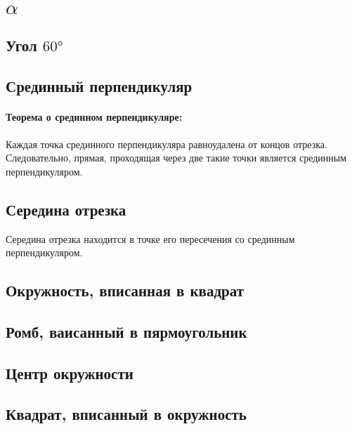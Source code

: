 \section{$\alpha $}
\subsection{Угол $60°$}
\subsection{Срединный перпендикуляр}
\paragraph{Теорема о срединном перпендикуляре:} Каждая точка срединного перпендикуляра равноудалена от концов отрезка.
Следовательно, прямая, проходящая через две такие точки является срединным перпендикуляром.
\subsection{Середина отрезка}
Середина отрезка находится в точке его пересечения со срединным перпендикуляром.
\subsection{Окружность, вписанная в квадрат}
\subsection{Ромб, ваисанный в пярмоугольник}
\subsection{Центр окружности}
\subsection{Квадрат, вписанный в окружность}